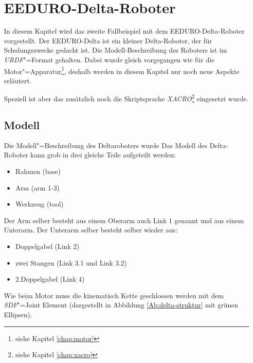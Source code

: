 \chapter{EEDURO-Delta-Roboter}


In diesem Kapitel wird das zweite Fallbeispiel mit dem EEDURO-Delta-Roboter vorgestellt.
Der EEDURO-Delta ist ein kleiner Delta-Roboter, der für Schulungszwecke gedacht ist.
Die Modell-Beschreibung des Roboters ist im \textit{URDF}"=Format gehalten.
Dabei wurde gleich vorgegangen wie für die Motor"=Apparatur\footnote{siehe Kapitel \ref{chap:motor}}, deshalb werden in diesem Kapitel nur noch neue Aspekte erläutert.

Speziell ist aber das zusätzlich noch die Skriptsprache \textit{XACRO}\footnote{siehe Kapitel \ref{chap:xacro}} eingesetzt wurde.

\section{Modell}
\label{chap:delta-modell}
Die Modell"=Beschreibung des Deltaroboters wurde %
Das Modell des Delta-Roboter kann grob in drei gleiche Teile aufgeteilt werden:
\begin{itemize}
\item Rahmen (base)
\item Arm (arm 1-3)
\item Werkzeug (tool)
\end{itemize}

Der Arm selber besteht aus einem Oberarm auch Link 1 genannt und aus einem Unterarm.
Der Unterarm selber besteht selber wieder aus:
\begin{itemize}
\item Doppelgabel (Link 2)
\item zwei Stangen (Link 3.1 und Link 3.2)
\item 2.Doppelgabel (Link 4)
\end{itemize}


Wie beim Motor muss die kinematisch Kette geschlossen werden mit dem \textit{SDF}"=Joint Element (dargestellt in Abbildung \ref{Ab:delta-struktur} mit grünen Ellipsen).

